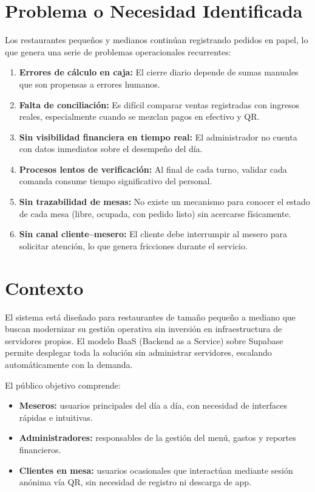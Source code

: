 \section{Problema o Necesidad Identificada}

Los restaurantes pequeños y medianos continúan registrando pedidos en papel, lo que
genera una serie de problemas operacionales recurrentes:

\begin{enumerate}[leftmargin=1.8em]
  \item \textbf{Errores de cálculo en caja:} El cierre diario depende de sumas
        manuales que son propensas a errores humanos.
  \item \textbf{Falta de conciliación:} Es difícil comparar ventas registradas con
        ingresos reales, especialmente cuando se mezclan pagos en efectivo y QR.
  \item \textbf{Sin visibilidad financiera en tiempo real:} El administrador no
        cuenta con datos inmediatos sobre el desempeño del día.
  \item \textbf{Procesos lentos de verificación:} Al final de cada turno, validar
        cada comanda consume tiempo significativo del personal.
  \item \textbf{Sin trazabilidad de mesas:} No existe un mecanismo para conocer
        el estado de cada mesa (libre, ocupada, con pedido listo) sin acercarse
        físicamente.
  \item \textbf{Sin canal cliente–mesero:} El cliente debe interrumpir al mesero
        para solicitar atención, lo que genera fricciones durante el servicio.
\end{enumerate}

\section{Contexto}

El sistema está diseñado para restaurantes de tamaño pequeño a mediano que buscan
modernizar su gestión operativa sin inversión en infraestructura de servidores
propios. El modelo BaaS (Backend as a Service) sobre Supabase permite desplegar
toda la solución sin administrar servidores, escalando automáticamente con la
demanda.

El público objetivo comprende:
\begin{itemize}[leftmargin=1.5em]
  \item \textbf{Meseros:} usuarios principales del día a día, con necesidad de
        interfaces rápidas e intuitivas.
  \item \textbf{Administradores:} responsables de la gestión del menú, gastos y
        reportes financieros.
  \item \textbf{Clientes en mesa:} usuarios ocasionales que interactúan mediante
        sesión anónima vía QR, sin necesidad de registro ni descarga de app.
\end{itemize}

